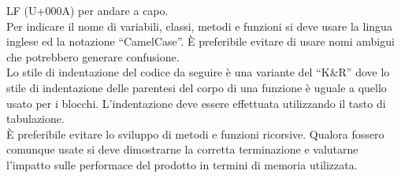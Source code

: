 \documentclass[../NormeDiProgetto.tex]{subfiles}
\begin{document}
					LF (U+000A) per andare a capo.\\
					Per indicare il nome di variabili, classi, metodi e funzioni si deve usare la lingua
					inglese ed la notazione ``CamelCase''. È preferibile evitare di usare nomi ambigui che
					potrebbero generare confusione.\\
					Lo stile di indentazione del codice da seguire è una variante del ``K\&R'' dove lo stile
					di indentazione delle parentesi del corpo di una funzione è uguale a quello usato per
					i blocchi. L'indentazione deve essere effettuata utilizzando il tasto di tabulazione.\\
					È preferibile evitare lo sviluppo di metodi e funzioni ricorsive. Qualora fossero
					comunque usate si deve dimostrarne la corretta terminazione e valutarne l'impatto sulle
					performace del prodotto in termini di memoria utilizzata.\\
\end{document}
